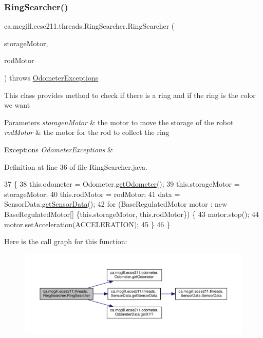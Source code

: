 \subsubsection{\texorpdfstring{Ring\+Searcher()}{RingSearcher()}}
{\footnotesize\ttfamily ca.\+mcgill.\+ecse211.\+threads.\+Ring\+Searcher.\+Ring\+Searcher (\begin{DoxyParamCaption}\item[{E\+V3\+Large\+Regulated\+Motor}]{storage\+Motor,  }\item[{E\+V3\+Medium\+Regulated\+Motor}]{rod\+Motor }\end{DoxyParamCaption}) throws \hyperlink{classca_1_1mcgill_1_1ecse211_1_1odometer_1_1_odometer_exceptions}{Odometer\+Exceptions}}

This class provides method to check if there is a ring and if the ring is the color we want


\begin{DoxyParams}{Parameters}
{\em storagen\+Motor} & the motor to move the storage of the robot \\
\hline
{\em rod\+Motor} & the motor for the rod to collect the ring \\
\hline
\end{DoxyParams}

\begin{DoxyExceptions}{Exceptions}
{\em Odometer\+Exceptions} & \\
\hline
\end{DoxyExceptions}


Definition at line 36 of file Ring\+Searcher.\+java.


\begin{DoxyCode}
37                                 \{
38     this.odometer = Odometer.\hyperlink{classca_1_1mcgill_1_1ecse211_1_1odometer_1_1_odometer_a99171f11e34dea918fa9dd069d721439}{getOdometer}();
39     this.storageMotor = storageMotor;
40     this.rodMotor = rodMotor;
41     data = SensorData.\hyperlink{classca_1_1mcgill_1_1ecse211_1_1threads_1_1_sensor_data_a8260aba53b4474ca1275e4ce26157977}{getSensorData}();
42     \textcolor{keywordflow}{for} (BaseRegulatedMotor motor : \textcolor{keyword}{new} BaseRegulatedMotor[] \{this.storageMotor, this.rodMotor\}) \{
43       motor.stop();
44       motor.setAcceleration(ACCELERATION);
45     \}
46   \}
\end{DoxyCode}
Here is the call graph for this function\+:\nopagebreak
\begin{figure}[H]
\begin{center}
\leavevmode
\includegraphics[width=350pt]{classca_1_1mcgill_1_1ecse211_1_1threads_1_1_ring_searcher_a58fdaba16c2b961446d1474b76e66e49_cgraph}
\end{center}
\end{figure}


